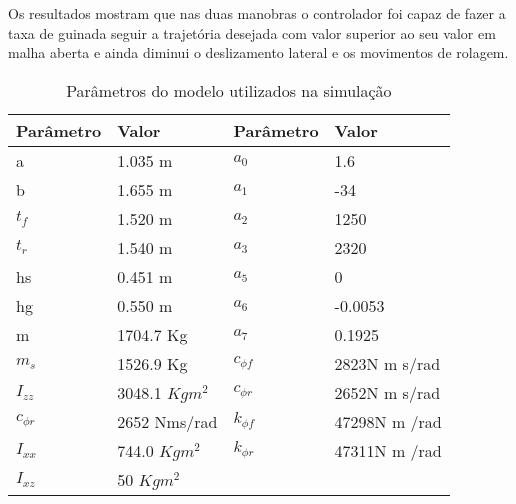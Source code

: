 Os resultados mostram que nas duas manobras o controlador foi capaz de fazer a
taxa de guinada seguir a trajetória desejada com valor superior ao seu valor em
malha aberta e ainda diminui o deslizamento lateral e os movimentos de rolagem.

\begin{table}[t!]
\caption{ Parâmetros do modelo utilizados na simulação}
\label{tab:model}
\begin{adjustbox}{width=\columnwidth,center}
\begin{tabular}{|ll|ll|}
\hline
  Parâmetro     & Valor           & Parâmetro       & Valor \\
 \hline
  a             & 1.035 m          &$a_0$             & 1.6   \\
  b             & 1.655 m          &$a_1$             & -34  \\
  $t_f$         & 1.520 m          &$a_2$             & 1250 \\
  $t_r$         & 1.540 m          &$a_3$             & 2320 \\
  hs            & 0.451 m          &$a_5$             & 0  \\
  hg            & 0.550 m          &$a_6$             & -0.0053 \\
  m             & 1704.7 Kg        &$a_7$             & 0.1925  \\
  $m_s$         & 1526.9 Kg        & $c_{\phi f}$     & 2823N m s/rad \\
  $I_{zz}$      & 3048.1 $Kgm^2$   & $c_{\phi r}$     & 2652N m s/rad\\
  $c_{\phi r}$  & 2652 Nms/rad     & $k_{\phi f}$     & 47298N m /rad\\
  $I_{xx}$      & 744.0 $Kgm^2$    & $k_{\phi r}$     & 47311N m /rad\\
  $I_{xz}$      & 50 $Kgm^2$       &                  & \\
\hline
\end{tabular}
\end{adjustbox}
\end{table}
